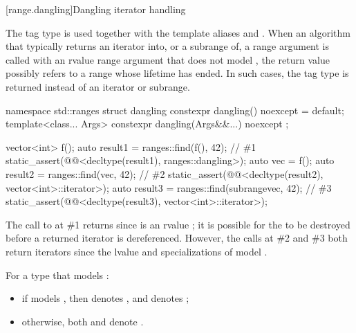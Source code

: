 [range.dangling]{Dangling iterator handling}

\pnum
The tag type  is used together with the template aliases
 and .
When an algorithm
that typically returns an iterator into, or a subrange of, a range argument
is called with an rvalue range argument
that does not model ,
the return value possibly refers to a range whose lifetime has ended.
In such cases,
the tag type  is returned instead of an iterator or subrange.
%
\begin{codeblock}
namespace std::ranges {
  struct dangling {
    constexpr dangling() noexcept = default;
    template<class... Args>
      constexpr dangling(Args&&...) noexcept { }
  };
}
\end{codeblock}

\pnum
\begin{example}
\begin{codeblock}
vector<int> f();
auto result1 = ranges::find(f(), 42);                                   // \#1
static_assert(@@<decltype(result1), ranges::dangling>);
auto vec = f();
auto result2 = ranges::find(vec, 42);                                   // \#2
static_assert(@@<decltype(result2), vector<int>::iterator>);
auto result3 = ranges::find(subrange{vec}, 42);                         // \#3
static_assert(@@<decltype(result3), vector<int>::iterator>);
\end{codeblock}
The call to  at \#1 returns 
since  is an rvalue ;
it is possible for the  to be destroyed
before a returned iterator is dereferenced.
However, the calls at \#2 and \#3 both return iterators
since the lvalue  and specializations of 
model .
\end{example}

\pnum
For a type  that models :
\begin{itemize}
\item
if  models , then
 denotes , and
 denotes ;
\item
otherwise,
both  and 
denote .
\end{itemize}

